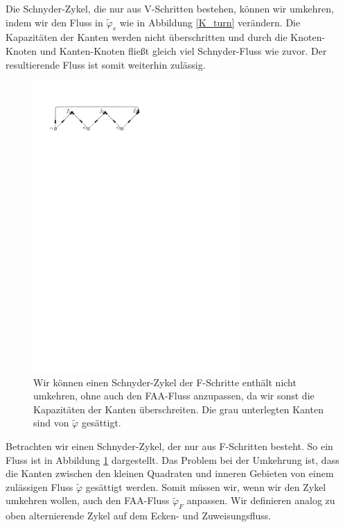 Die Schnyder-Zykel, die nur aus V-Schritten bestehen, können wir umkehren, indem wir den Fluss in $\tilde{\varphi}_s$ wie in Abbildung \ref{K_turn} verändern. Die Kapazitäten der Kanten werden nicht überschritten und durch die Knoten-Knoten und Kanten-Knoten fließt gleich viel Schnyder-Fluss wie zuvor. Der resultierende Fluss ist somit weiterhin zulässig.

\begin{figure}
\centering
\includegraphics[width=0.7\textwidth]{G_kreis.pdf}
\caption{Wir können einen Schnyder-Zykel der F-Schritte enthält nicht umkehren, ohne auch den FAA-Fluss anzupassen, da wir sonst die Kapazitäten der Kanten überschreiten. Die grau unterlegten Kanten sind von $\tilde{\varphi}$ gesättigt.}
\label{G_turn}
\end{figure}

Betrachten wir einen Schnyder-Zykel, der nur aus F-Schritten besteht. So ein Fluss ist in Abbildung \ref{G_turn} dargestellt. Das Problem bei der Umkehrung ist, dass die Kanten zwischen den kleinen Quadraten und inneren Gebieten von einem zulässigen Fluss $\tilde{\varphi}$ gesättigt werden. Somit müssen wir, wenn wir den Zykel umkehren wollen, auch den FAA-Fluss $\tilde{\varphi}_F$ anpassen. Wir definieren analog zu oben alternierende Zykel auf dem Ecken- und Zuweisungsfluss.

